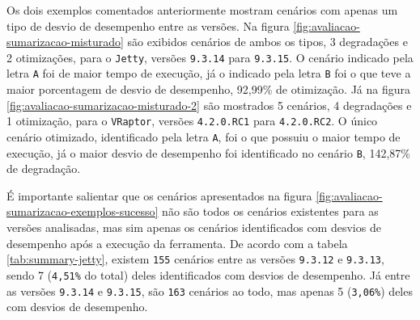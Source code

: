 Os dois exemplos comentados anteriormente mostram cenários com apenas um tipo de desvio de desempenho entre as versões. Na figura \ref{fig:avaliacao-sumarizacao-misturado} são exibidos cenários de ambos os tipos, 3 degradações e 2 otimizações, para o \texttt{Jetty}, versões \texttt{9.3.14} para \texttt{9.3.15}. O cenário indicado pela letra \texttt{A} foi de maior tempo de execução, já o indicado pela letra \texttt{B} foi o que teve a maior porcentagem de desvio de desempenho, 92,99\% de otimização. Já na figura \ref{fig:avaliacao-sumarizacao-misturado-2} são mostrados 5 cenários, 4 degradações e 1 otimização, para o \texttt{VRaptor}, versões \texttt{4.2.0.RC1} para \texttt{4.2.0.RC2}. O único cenário otimizado, identificado pela letra \texttt{A}, foi o que possuiu o maior tempo de execução, já o maior desvio de desempenho foi identificado no cenário \texttt{B}, 142,87\% de degradação.

É importante salientar que os cenários apresentados na figura \ref{fig:avaliacao-sumarizacao-exemplos-sucesso} não são todos os cenários existentes para as versões analisadas, mas sim apenas os cenários identificados com desvios de desempenho após a execução da ferramenta. De acordo com a tabela \ref{tab:summary-jetty}, existem \texttt{155} cenários entre as versões \texttt{9.3.12} e \texttt{9.3.13}, sendo 7 (\texttt{4,51\%} do total) deles identificados com desvios de desempenho. Já entre as versões \texttt{9.3.14} e \texttt{9.3.15}, são \texttt{163} cenários ao todo, mas apenas 5 (\texttt{3,06\%}) deles com desvios de desempenho.

